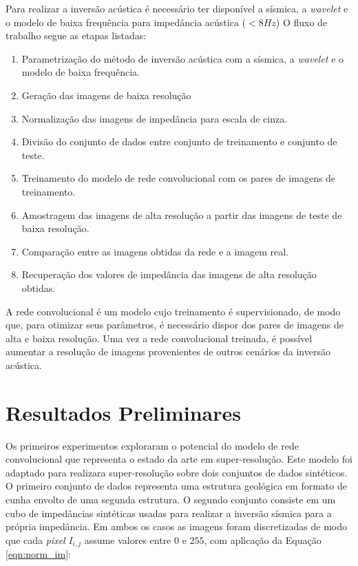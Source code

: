Para realizar a inversão acústica é necessário ter disponível a sísmica, a \textit{wavelet}
e o modelo de baixa frequência para impedância acústica ($<8Hz$) %
O fluxo de trabalho segue as etapas listadas:
 
\begin{enumerate}
  \item Parametrização do método de inversão acústica com a sísmica, a \textit{wavelet} e o modelo de baixa frequência.
  \item Geração das imagens de baixa resolução
  \item Normalização das imagens de impedância para escala de cinza.
  \item Divisão do conjunto de dados entre conjunto de treinamento e conjunto de teste.
  \item Treinamento do modelo de rede convolucional com os pares de imagens de treinamento.
  \item Amostragem das imagens de alta resolução a partir das imagens de teste de baixa resolução.
  \item Comparação entre as imagens obtidas da rede e a imagem real.
  \item Recuperação dos valores de impedância das imagens de alta resolução obtidas.
\end{enumerate}

A rede convolucional é um modelo cujo treinamento é supervisionado, de modo que,
para otimizar seus parâmetros, é necessário dispor dos pares de imagens de alta
e baixa resolução. Uma vez a rede convolucional treinada, é possível aumentar a
resolução de imagens provenientes de outros cenários da inversão acústica.

\section{Resultados Preliminares}
Os primeiros experimentos exploraram o potencial do modelo de rede convolucional que representa
o estado da arte em super-resolução. Este modelo foi adaptado para realizara super-resolução
sobre dois conjuntos de dados sintéticos. O primeiro conjunto de dados representa uma estrutura
geológica em formato de cunha envolto de uma segunda estrutura.
O segundo conjunto consiste em um cubo de impedâncias sintéticas usadas para realizar a inversão
sísmica para a própria impedância.
Em ambos os casos as imagens foram discretizadas de modo que cada \textit{pixel} $I_{i,j}$ assume 
valores entre $0$ e $255$, com aplicação da Equação \ref{eqn:norm_im}:

